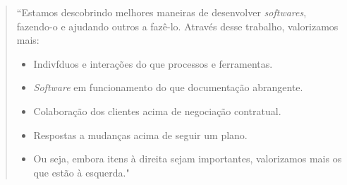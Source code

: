 \begin{quotation}
“Estamos descobrindo melhores maneiras de desenvolver \textit{softwares}, fazendo-o e ajudando outros a fazê-lo. Através desse trabalho, valorizamos mais:

\begin{itemize}
\item Indivfduos e interações do que processos e ferramentas.
\item \textit{Software} em funcionamento do que documentação abrangente.
\item Colaboração dos clientes acima de negociação contratual.
\item Respostas a mudanças acima de seguir um plano.
\item Ou seja, embora itens à direita sejam importantes, valorizamos mais os que estão à esquerda.\cite{SOMMERVILLE2011}"
\end{itemize}
\end{quotation}

